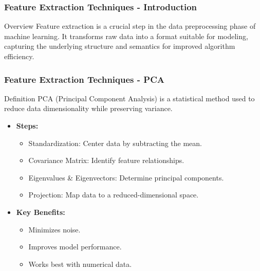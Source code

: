 \documentclass[aspectratio=169]{beamer}
\begin{document}
\begin{frame}[fragile]
    \frametitle{Feature Extraction Techniques - Introduction}
    \begin{block}{Overview}
        Feature extraction is a crucial step in the data preprocessing phase of machine learning. It transforms raw data into a format suitable for modeling, capturing the underlying structure and semantics for improved algorithm efficiency.
    \end{block}
\end{frame}

\begin{frame}[fragile]
    \frametitle{Feature Extraction Techniques - PCA}
    \begin{block}{Definition}
        PCA (Principal Component Analysis) is a statistical method used to reduce data dimensionality while preserving variance.
    \end{block}

    \begin{itemize}
        \item \textbf{Steps:}
        \begin{itemize}
            \item Standardization: Center data by subtracting the mean.
            \item Covariance Matrix: Identify feature relationships.
            \item Eigenvalues & Eigenvectors: Determine principal components.
            \item Projection: Map data to a reduced-dimensional space.
        \end{itemize}
        \item \textbf{Key Benefits:}
        \begin{itemize}
            \item Minimizes noise.
            \item Improves model performance.
            \item Works best with numerical data.
        \end{itemize}
    \end{itemize}
\end{frame}
\end{document}
